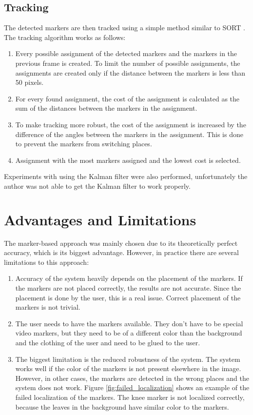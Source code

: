 \subsection{Tracking}
\label{tracking}
The detected markers are then tracked using a simple method similar to SORT \cite{sort}. The tracking algorithm works as follows:

\begin{enumerate}
    \item Every possible assignment of the detected markers and the markers in the previous frame is created. To limit the number of possible assignments, the assignments are created only if the distance between the markers is less than 50 pixels.
    \item For every found assignment, the cost of the assignment is calculated as the sum of the distances between the markers in the assignment.
    \item To make tracking more robust, the cost of the assignment is increased by the difference of the angles between the markers in the assignment. This is done to prevent the markers from switching places.
    \item Assignment with the most markers assigned and the lowest cost is selected.
\end{enumerate}

Experiments with using the Kalman filter were also performed, unfortunately the author was not able to get the Kalman filter to work properly.

\section{Advantages and Limitations}
The marker-based approach was mainly chosen due to its theoretically perfect accuracy, which is
its biggest advantage. However, in practice there are several limitations to this approach:

\begin{enumerate}
    \item Accuracy of the system heavily depends on the placement of the markers. If the markers are not placed correctly, the results are not accurate. Since the placement is done by the user, this is a real issue. Correct placement of the markers is not trivial.
    \item The user needs to have the markers available. They don't have to be special video markers, but they need to be of a different color than the background and the clothing of the user and need to be glued to the user.
    \item The biggest limitation is the reduced robustness of the system. The system works well if the color of the markers is not present elsewhere in the image. However, in other cases, the markers are detected in the wrong places and the system does not work. Figure \ref{fig:failed_localization} shows an example of the failed localization of the markers. The knee marker is not localized correctly, because the leaves in the background have similar color to the markers.
\end{enumerate}

